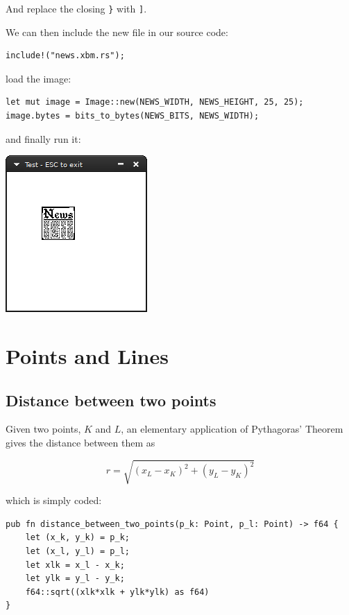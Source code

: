 \documentclass[12pt,a4,oneside,usenames,dvipsnames]{book}
\begin{document}
And replace the closing \texttt{\}} with \texttt{]}.

We can then include the new file in our source code:


\begin{verbatim}
include!("news.xbm.rs");
\end{verbatim}

load the image:

\begin{verbatim}
let mut image = Image::new(NEWS_WIDTH, NEWS_HEIGHT, 25, 25);
image.bytes = bits_to_bytes(NEWS_BITS, NEWS_WIDTH);
\end{verbatim}

and finally run it:

\includegraphics{figures/intro-2.png}

\part{Points and Lines}
\chapter{Distance between two points}

\begin{center}

\end{center}

Given two points, $K$ and $L$, an elementary application of Pythagoras' Theorem gives the distance between them as

\begin{equation}
  r = \sqrt{(x_{L} - x_{K})^{2} +(y_{L} - y_{K})^{2}}
\end{equation}

which is simply coded:

\begin{verbatim}
pub fn distance_between_two_points(p_k: Point, p_l: Point) -> f64 {
    let (x_k, y_k) = p_k;
    let (x_l, y_l) = p_l;
    let xlk = x_l - x_k;
    let ylk = y_l - y_k;
    f64::sqrt((xlk*xlk + ylk*ylk) as f64)
}
\end{verbatim}
\end{document}

